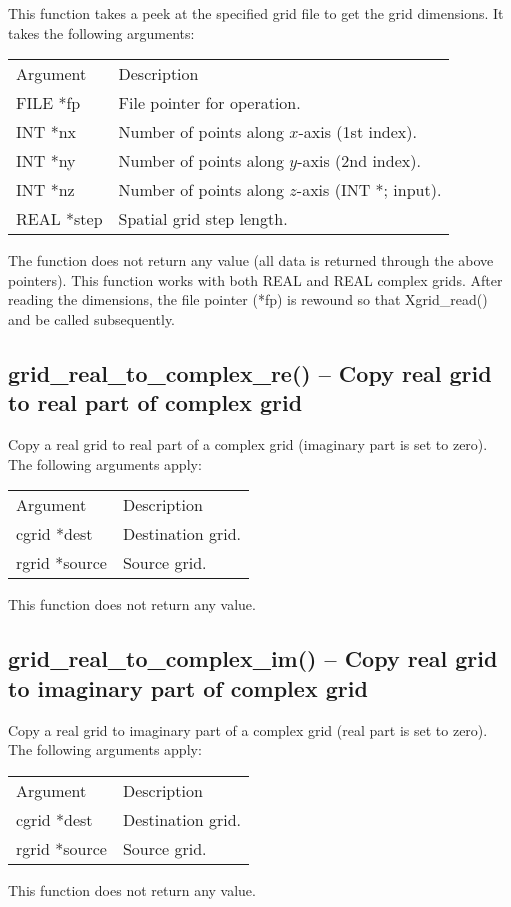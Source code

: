 \documentclass[12pt,letterpaper]{report}
\begin{document}
This function takes a peek at the specified grid file to get the grid dimensions. It takes the following arguments:
\begin{longtable}{p{} p{}}
Argument & Description\\
\cline{1-2}
FILE *fp & File pointer for operation.\\                                                                                   
INT *nx & Number of points along $x$-axis (1st index).\\
INT *ny & Number of points along $y$-axis (2nd index).\\
INT *nz & Number of points along $z$-axis (INT *; input).\\
REAL *step & Spatial grid step length.\\
\end{longtable}
\noindent
The function does not return any value (all data is returned through the above pointers). This function works with both REAL and REAL complex grids. After reading the dimensions, the file pointer (*fp) is rewound so that Xgrid\_read() and be called subsequently.

\subsection{grid\_real\_to\_complex\_re() -- Copy real grid to real part of complex grid}

Copy a real grid to real part of a complex grid (imaginary part is set to zero). The following arguments apply:
\begin{longtable}{p{} p{}}
Argument & Description\\
\cline{1-2}
cgrid *dest & Destination grid.\\
rgrid *source & Source grid.\\
\end{longtable}
\noindent
This function does not return any value.

\subsection{grid\_real\_to\_complex\_im() -- Copy real grid to imaginary part of complex grid}

Copy a real grid to imaginary part of a complex grid (real part is set to zero). The following arguments apply:
\begin{longtable}{p{} p{}}
Argument & Description\\
\cline{1-2}
cgrid *dest & Destination grid.\\
rgrid *source & Source grid.\\
\end{longtable}
\noindent
This function does not return any value.
\end{document}
